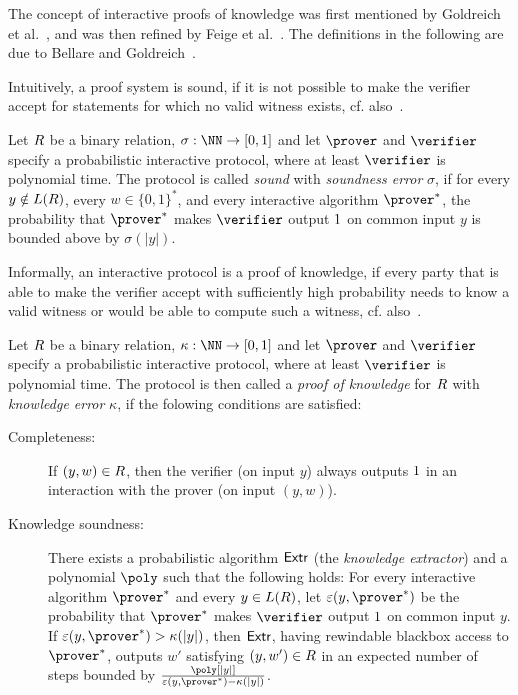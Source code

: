 \documentclass[runningheads]{llncs}
\begin{document}
The concept of interactive proofs of knowledge was first mentioned by Goldreich et al.~\cite{STOC:GolMicRac85}, and was then refined by Feige et al.~\cite{STOC:FeiFiaSha87}.
The definitions in the following are due to Bellare and Goldreich~\cite{C:BelGol92}.

Intuitively, a proof system is sound, if it is not possible to make the verifier accept for statements for which no valid witness exists, cf. also~\cite[1.6.2]{zkproof-reference}.
\begin{definition}\label{def:soundness}
  Let $R$ be a binary relation, $\sigma:\NN\to[0,1]$ and let $\prover$ and $\verifier$ specify a probabilistic interactive protocol, where at least $\verifier$ is polynomial time.
  The protocol is called \emph{sound} with \emph{soundness error} $\sigma$, if for every $y\notin L(R)$, every $w\in\{0,1\}^*$, and every interactive algorithm $\prover^*$, the probability that $\prover^*$ makes $\verifier$ output $1$ on common input $y$ is bounded above by $\sigma(|y|)$. 
\end{definition}

Informally, an interactive protocol is a proof of knowledge, if every party that is able to make the verifier accept with sufficiently high probability needs to know a valid witness or would be able to compute such a witness, cf. also~\cite[1.6.3]{zkproof-reference}.
\begin{definition}\label{def:pok}
  Let $R$ be a binary relation, $\kappa:\NN\to[0,1]$ and let $\prover$ and $\verifier$ specify a probabilistic interactive protocol, where at least $\verifier$ is polynomial time.
  The protocol is then called a \emph{proof of knowledge} for $R$ with \emph{knowledge error} $\kappa$, if the folowing conditions are satisfied:
  \begin{description}
    \item[Completeness:]
      If $(y,w)\in R$, then the verifier (on input $y$) always outputs $1$ in an interaction with the prover (on input $(y,w)$).
    \item[Knowledge soundness:]
      There exists a probabilistic algorithm $\mathsf{Extr}$ (the \emph{knowledge extractor}) and a polynomial $\poly$ such that the following holds:
      For every interactive algorithm $\prover^*$ and every $y\in L(R)$, let $\varepsilon(y,\prover^*)$ be the probability that $\prover^*$ makes $\verifier$ output $1$ on common input $y$.
      If $\varepsilon(y,\prover^*)>\kappa(|y|)$, then $\mathsf{Extr}$, having rewindable blackbox access to $\prover^*$, outputs $w'$ satisfying $(y,w')\in R$ in an expected number of steps bounded by $\frac{\poly[|y|]}{\varepsilon(y,\prover^*)-\kappa(|y|)}$.
  \end{description}
\end{definition}
\end{document}
